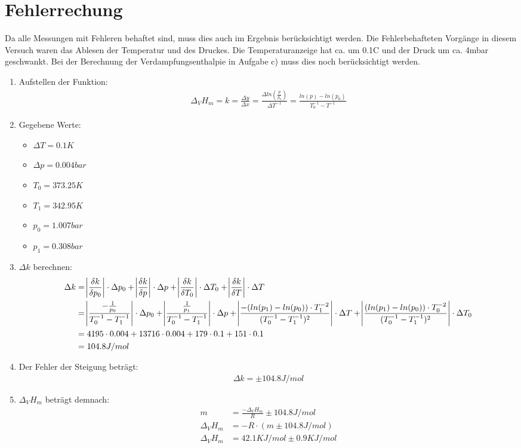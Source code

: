 \section{Fehlerrechung}
Da alle Messungen mit Fehleren behaftet sind, muss dies auch im Ergebnis
berücksichtigt werden. Die Fehlerbehafteten Vorgänge in diesem Versuch waren
das Ablesen der Temperatur und des Druckes. Die Temperaturanzeige hat ca.
um 0.1C und der Druck um ca. 4mbar geschwankt. Bei der Berechnung der 
Verdampfungsenthalpie in Aufgabe c) muss dies noch berücksichtigt werden.

\begin{enumerate}
    \item Aufstellen der Funktion:
    \begin{align*}
        \Delta_V H_m = k = \frac{\Delta y}{\Delta x} = \frac{\Delta 
        ln(\frac{p}{p_0})}{\Delta T^{-1}} 
        = \frac{ln(p) - ln(p_0)}{T_0^{-1} - T^{-1}}
    \end{align*}
    \item Gegebene Werte: 
    \begin{itemize}
        \item $\Delta T = 0.1K$
        \item $\Delta p = 0.004bar$
        \item $T_0 = 373.25K$
        \item $T_1 = 342.95K$
        \item $p_0 = 1.007bar$
        \item $p_1 = 0.308bar$
    \end{itemize}
    \item $\Delta k$ berechnen:
    \begin{align*}
        \Delta k &= \abs{\frac{\delta k}{\delta p_0}} \cdot \Delta p_0
        + \abs{\frac{\delta k}{\delta p}} \cdot \Delta p 
        + \abs{\frac{\delta k}{\delta T_0}} \cdot \Delta T_0
        + \abs{\frac{\delta k}{\delta T}} \cdot \Delta T \\
        &= \abs{\frac{-\frac{1}{p_0}}{T_0^{-1} - T_1^{-1}}} \cdot \Delta p_0
        + \abs{\frac{\frac{1}{p_1}}{T_0^{-1} - T_1^{-1}}} \cdot \Delta p
        + \abs{\frac{-(ln(p_1) - ln(p_0)) \cdot T_1^{-2}}{(T_0^{-1} - T_1^{-1})^2}} \cdot \Delta T
        + \abs{\frac{(ln(p_1)-ln(p_0)) \cdot T_0^{-2}}{(T_0^{-1} - T_1^{-1})^2}} \cdot \Delta T_0 \\
        &= 4195 \cdot 0.004 + 13716 \cdot 0.004 + 179 \cdot 0.1 + 151 \cdot 0.1 \\
        &= 104.8 J/mol
    \end{align*}
     \item Der Fehler der Steigung beträgt: 
     \begin{align*}
         \Delta k = \pm 104.8 J/mol
     \end{align*}
     \item $\Delta_V H_m$ beträgt demnach:
     \begin{align*}
        m &= \frac{-\Delta_V H_m}{R} \pm 104.8 J/mol \\
        \Delta_V H_m &= - R \cdot  (m \pm 104.8 J/mol) \\
        \Delta_V H_m &= 42.1 KJ/mol \pm 0.9 KJ/mol
     \end{align*}  
\end{enumerate}